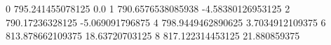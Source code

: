0 795.241455078125 0.0
1 790.6576538085938 -4.58380126953125
2 790.17236328125 -5.069091796875
4 798.9449462890625 3.7034912109375
6 813.878662109375 18.63720703125
8 817.122314453125 21.880859375
